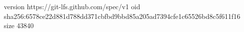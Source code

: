 version https://git-lfs.github.com/spec/v1
oid sha256:6578ce22d881d788dd371cbfbd9bbd85a205ad7394cfe1c65526bd8c5f611f16
size 43840
